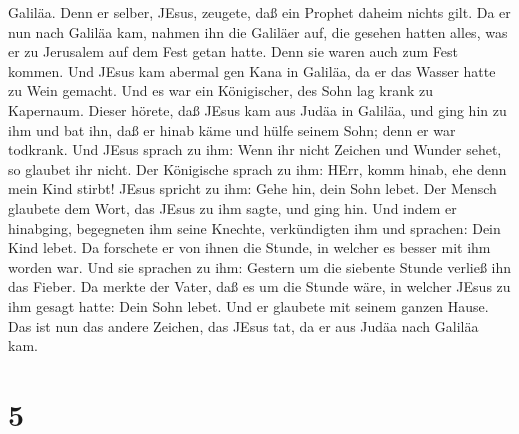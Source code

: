 Galiläa.  Denn er selber, JEsus, zeugete, daß ein Prophet
daheim nichts gilt.  Da er nun nach Galiläa kam, nahmen ihn
die Galiläer auf, die gesehen hatten alles, was er zu Jerusalem auf dem
Fest getan hatte. Denn sie waren auch zum Fest kommen.  Und
JEsus kam abermal gen Kana in Galiläa, da er das Wasser hatte zu Wein
gemacht.  Und es war ein Königischer, des Sohn lag krank zu
Kapernaum. Dieser hörete, daß JEsus kam aus Judäa in Galiläa, und ging
hin zu ihm und bat ihn, daß er hinab käme und hülfe seinem Sohn; denn er
war todkrank.  Und JEsus sprach zu ihm: Wenn ihr nicht
Zeichen und Wunder sehet, so glaubet ihr nicht.  Der
Königische sprach zu ihm: HErr, komm hinab, ehe denn mein Kind stirbt!
 JEsus spricht zu ihm: Gehe hin, dein Sohn lebet. Der
Mensch glaubete dem Wort, das JEsus zu ihm sagte, und ging hin.
 Und indem er hinabging, begegneten ihm seine Knechte,
verkündigten ihm und sprachen: Dein Kind lebet.  Da
forschete er von ihnen die Stunde, in welcher es besser mit ihm worden
war. Und sie sprachen zu ihm: Gestern um die siebente Stunde verließ ihn
das Fieber.  Da merkte der Vater, daß es um die Stunde
wäre, in welcher JEsus zu ihm gesagt hatte: Dein Sohn lebet. Und er
glaubete mit seinem ganzen Hause.  Das ist nun das andere
Zeichen, das JEsus tat, da er aus Judäa nach Galiläa kam.

\hypertarget{section-4}{%
\section{5}\label{section-4}}

